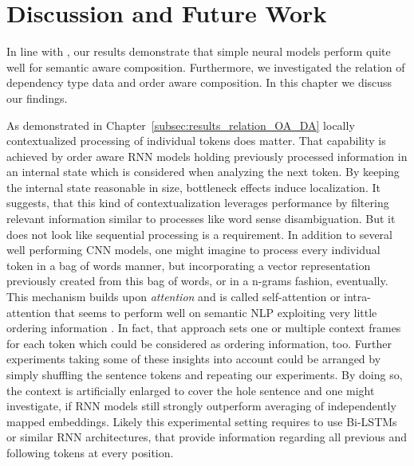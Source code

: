 \section{Discussion and Future Work}

In line with \textcite{mueller_siamese_2016,iyyer_deep_2015}, our results demonstrate that simple neural models perform quite well for semantic aware composition. Furthermore, we investigated the relation of dependency type data and order aware composition. In this chapter we discuss our findings.%

As demonstrated in Chapter~\ref{subsec:results_relation_OA_DA} locally contextualized processing of individual tokens does matter. That capability is achieved by order aware \ac{RNN} models holding previously processed information in an internal state which is considered when analyzing the next token. By keeping the internal state reasonable in size, bottleneck effects induce localization. It suggests, that this kind of contextualization leverages performance by filtering relevant information similar to processes like word sense disambiguation. But it does not look like sequential processing is a requirement. In addition to several well performing \ac{CNN} models, one might imagine to process every individual token in a bag of words manner, but incorporating a vector representation previously created from this bag of words, or in a n-grams fashion, eventually. This mechanism builds upon \textit{attention} \autocite{bahdanau_neural_2014, vaswani_attention_2017} and is called self-attention or intra-attention \autocite{cheng_long_2016} that seems to perform well on semantic \ac{NLP} exploiting very little%
ordering information \autocite{parikh_decomposable_2016}. In fact, that approach sets one or multiple context frames for each token which could be considered as ordering information, too.%
Further experiments taking some of these insights into account could be arranged by simply shuffling the sentence tokens and repeating our experiments. By doing so, the context is artificially enlarged to cover the hole sentence and one might investigate, if \ac{RNN} models still strongly outperform averaging of independently mapped embeddings. Likely this experimental setting requires to use Bi-LSTMs \autocite{graves_speech_2013} or similar \ac{RNN} architectures, that provide information regarding all previous and following tokens at every position.

